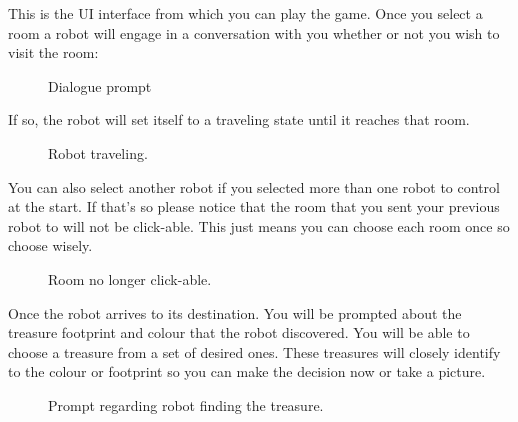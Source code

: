 	This is the UI interface from which you can play the game. Once you select a room a robot will engage in a conversation with you whether or not you wish to visit the room: \\
	\begin{figure}[htp]
		\centering
		\caption{Dialogue prompt}
	\end{figure}
	If so, the robot will set itself to a traveling state until it reaches that room. \\
	\begin{figure}[htp]
		\centering
		\caption{Robot traveling.}
	\end{figure}
	You can also select another robot if you selected more than one robot to control at the start. If that's so please notice that the room that you sent your previous robot to will not be click-able. This just means you can choose each room once so choose wisely.
	\begin{figure}[htp]
		\centering
		\caption{Room no longer click-able.}
	\end{figure}
	Once the robot arrives to its destination. You will be prompted about the treasure footprint and colour that the robot discovered. You will be able to choose a treasure from a set of desired ones. These treasures will closely identify to the colour or footprint so you can make the decision now or take a picture.
	\begin{figure}[htp]
		\centering
		\caption{Prompt regarding robot finding the treasure.}
	\end{figure}

